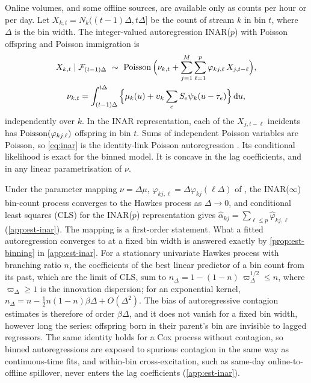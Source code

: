 Online volumes, and some offline sources, are available only as counts per hour or per
day. Let $X_{k,t}=N_k((t-1)\Delta,t\Delta]$ be the count of stream $k$ in bin $t$, where
$\Delta$ is the bin width. The integer-valued autoregression INAR($p$) with Poisson
offspring and Poisson immigration is
\begin{equation}\label{eq:inar}
\begin{gathered}
  X_{k,t}\mid\Hist_{(t-1)\Delta}\ \sim\ \Pois\Big(\nu_{k,t}+\sum_{j=1}^M\sum_{\ell=1}^p\varphi_{kj,\ell}\,X_{j,t-\ell}\Big),\\
  \nu_{k,t}=\int_{(t-1)\Delta}^{t\Delta}\Big\{\mu_k(u)+\upsilon_k\sum_eS_e\psi_k(u-\tau_e)\Big\}\,\dd u,
\end{gathered}
\end{equation}
independently over $k$. In the INAR representation, each of the $X_{j,t-\ell}$ incidents
has $\operatorname{Poisson}(\varphi_{kj,\ell})$ offspring in bin $t$. Sums of independent Poisson
variables are Poisson, so \eqref{eq:inar} is the identity-link Poisson autoregression
\citep{fokianos2009}. Its conditional likelihood is exact for the binned model. It is concave in the lag
coefficients, and in any linear parametrisation of $\nu$.

Under the parameter mapping $\nu=\Delta\mu$, $\varphi_{kj,\ell}=\Delta\varphi_{kj}(\ell\Delta)$
of \citet{kirchner2016,kirchner2017}, the INAR($\infty$) bin-count process converges to the
Hawkes process as $\Delta\to0$, and conditional least squares (CLS) for the INAR($p$)
representation gives $\hat\alpha_{kj}=\sum_{\ell\le p}\hat\varphi_{kj,\ell}$
(\cref{app:est-inar}). The mapping is a first-order statement. What a fitted
autoregression converges to at a fixed bin width is answered exactly by
\cref{prop:est-binning} in \cref{app:est-inar}. For a stationary univariate Hawkes process
with branching ratio $n$, the coefficients of the best linear predictor of a bin count
from its past, which are the limit of CLS, sum to $n_\Delta=1-(1-n)\,\varpi_\Delta^{1/2}\le n$,
where $\varpi_\Delta\ge1$ is the innovation dispersion; for an exponential kernel,
$n_\Delta=n-\tfrac12n(1-n)\beta\Delta+O(\Delta^2)$. The bias of autoregressive contagion
estimates is therefore of order $\beta\Delta$, and it does not vanish for a fixed bin width,
however long the series: offspring born in their parent's bin are invisible to lagged
regressors. The same identity holds for a Cox process without contagion, so binned
autoregressions are exposed to spurious contagion in the same way as continuous-time fits,
and within-bin cross-excitation, such as same-day online-to-offline spillover, never enters
the lag coefficients (\cref{app:est-inar}).

